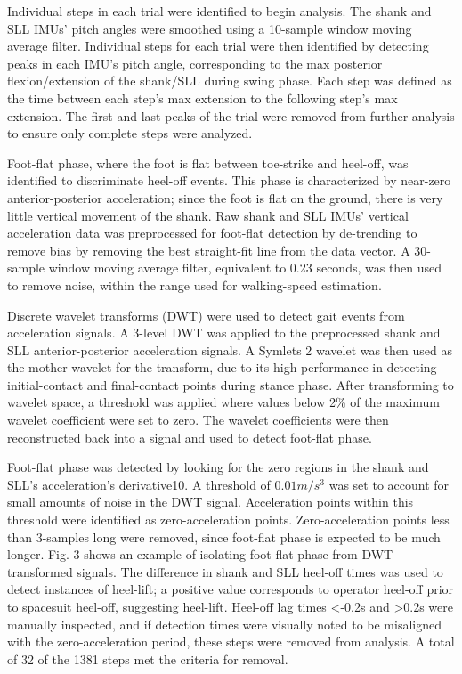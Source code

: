 \documentclass[defaultstyle,11pt]{comps}
\begin{document}
Individual steps in each trial were identified to begin analysis.
The shank and SLL IMUs' pitch angles were smoothed using a 10-sample window moving average filter.
Individual steps for each trial were then identified by detecting peaks in each IMU's pitch angle, corresponding to the max posterior flexion/extension of the shank/SLL during swing phase.
Each step was defined as the time between each step's max extension to the following step's max extension.
The first and last peaks of the trial were removed from further analysis to ensure only complete steps were analyzed.

Foot-flat phase, where the foot is flat between toe-strike and heel-off, was identified to discriminate heel-off events.
This phase is characterized by near-zero anterior-posterior acceleration; since the foot is flat on the ground, there is very little vertical movement of the shank\citep{Rebula2013}.
Raw shank and SLL IMUs' vertical acceleration data was preprocessed for foot-flat detection by de-trending to remove bias by removing the best straight-fit line from the data vector.
A 30-sample window moving average filter, equivalent to 0.23 seconds, was then used to remove noise, within the range used for walking-speed estimation\citep{Byun2019}.

Discrete wavelet transforms (DWT) were used to detect gait events from acceleration signals\citep{Ji2019}.
A 3-level DWT was applied to the preprocessed shank and SLL anterior-posterior acceleration signals.
A Symlets 2 wavelet was then used as the mother wavelet for the transform, due to its high performance in detecting initial-contact and final-contact points during stance phase\citep{Ji2019}.
After transforming to wavelet space, a threshold was applied where values below 2\% of the maximum wavelet coefficient were set to zero.
The wavelet coefficients were then reconstructed back into a signal and used to detect foot-flat phase.

Foot-flat phase was detected by looking for the zero regions in the shank and SLL's acceleration's derivative10.
A threshold of \(0.01 m/s^3\) was set to account for small amounts of noise in the DWT signal.
Acceleration points within this threshold were identified as zero-acceleration points.
Zero-acceleration points less than 3-samples long were removed, since foot-flat phase is expected to be much longer.
Fig. 3 shows an example of isolating foot-flat phase from DWT transformed signals.
The difference in shank and SLL heel-off times was used to detect instances of heel-lift; a positive value corresponds to operator heel-off prior to spacesuit heel-off, suggesting heel-lift.
Heel-off lag times \textless-0.2s and \textgreater0.2s were manually inspected, and if detection times were visually noted to be misaligned with the zero-acceleration period, these steps were removed from analysis.
A total of 32 of the 1381 steps met the criteria for removal.
\end{document}
